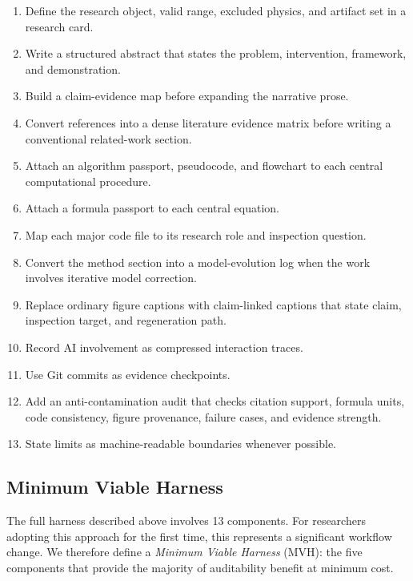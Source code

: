 \documentclass{article}
\newcommand{\revmark}{\marginpar{\footnotesize\textcolor{blue}{\textbf{Rev.\,2}}}}
\begin{document}
\begin{enumerate}
    \item Define the research object, valid range, excluded physics, and artifact set in a research card.
    \item Write a structured abstract that states the problem, intervention, framework, and demonstration.
    \item Build a claim-evidence map before expanding the narrative prose.
    \item Convert references into a dense literature evidence matrix before writing a conventional related-work section.
    \item Attach an algorithm passport, pseudocode, and flowchart to each central computational procedure.
    \item Attach a formula passport to each central equation.
    \item Map each major code file to its research role and inspection question.
    \item Convert the method section into a model-evolution log when the work involves iterative model correction.
    \item Replace ordinary figure captions with claim-linked captions that state claim, inspection target, and regeneration path.
    \item Record AI involvement as compressed interaction traces.
    \item Use Git commits as evidence checkpoints.
    \item Add an anti-contamination audit that checks citation support, formula units, code consistency, figure provenance, failure cases, and evidence strength.
    \item State limits as machine-readable boundaries whenever possible.
\end{enumerate}

\subsection{Minimum Viable Harness}\revmark

The full harness described above involves 13 components. For researchers adopting this approach for the first time, this represents a significant workflow change. We therefore define a \emph{Minimum Viable Harness} (MVH): the five components that provide the majority of auditability benefit at minimum cost.
\end{document}
